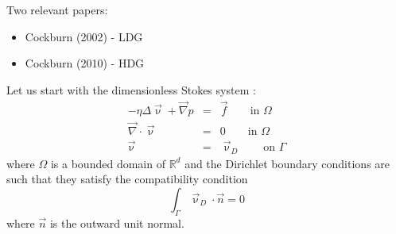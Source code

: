 Two relevant papers: 
\begin{itemize}
\item Cockburn \etal (2002) \cite{coks02} - LDG
\item Cockburn \etal (2010) \cite{conp10} - HDG
\end{itemize}

Let us start with the dimensionless Stokes system \cite{coks02}:
\begin{eqnarray}
- \eta \Delta \vec\upnu + \vec\nabla p &=& \vec{f}  \qquad \textrm{in } \Omega\\
\vec\nabla\cdot\vec\upnu &=& 0 \qquad \textrm{in } \Omega\\
\vec{\upnu} &=& \vec{\upnu}_D \qquad \textrm{on } \Gamma
\end{eqnarray}
where $\Omega$ is a bounded domain of $\mathbb{R}^d$ and the Dirichlet boundary conditions are
such that they satisfy the compatibility condition
\[
\int_\Gamma \vec\upnu_D \cdot \vec{n} =0
\]
where $\vec{n}$ is the outward unit normal. 

